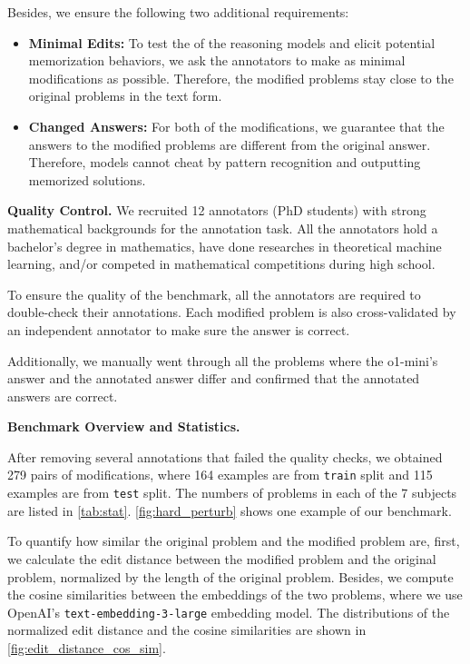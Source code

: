 Besides, we ensure the following two additional requirements:

\begin{itemize}[itemsep=1pt, parsep=1pt, topsep=1pt]
\item \textbf{Minimal Edits:} To test the  of the reasoning models and elicit potential memorization behaviors, we ask the annotators to make as minimal modifications as possible. Therefore, the modified problems stay close to the original problems in the text form.  

\item \textbf{Changed Answers:} For both of the modifications, we guarantee that the answers to the modified problems are different from the original answer. Therefore, models cannot cheat by pattern recognition and outputting memorized solutions. %
\end{itemize}




\textbf{Quality Control.}
We recruited 12 annotators (PhD students) with strong mathematical backgrounds for the annotation task. All the annotators hold a bachelor's degree in mathematics, have done researches in theoretical machine learning, and/or competed in mathematical competitions during high school.

To ensure the quality of the benchmark, all the annotators are required to double-check their annotations. Each modified problem is also cross-validated by an independent annotator to make sure the answer is correct.

Additionally, we manually went through all the problems where the o1-mini's answer and the annotated answer differ and confirmed that the annotated answers are correct. %



\textbf{Benchmark Overview and Statistics.}

After removing several annotations that failed the quality checks, we obtained 279 pairs of modifications, where 164 examples are from \texttt{train} split and 115 examples are from \texttt{test} split. The numbers of problems in each 
 of the 7 subjects are listed in \cref{tab:stat}. \cref{fig:hard_perturb} shows one example of our benchmark.

To quantify how similar the original problem and the modified problem are,  first, we calculate the edit distance between the modified problem and the original problem, normalized by the length of the original problem. Besides, we compute the cosine similarities between the embeddings of the two problems, where we use OpenAI's \texttt{text-embedding-3-large} embedding model. The distributions of the normalized edit distance and the cosine similarities are shown in \cref{fig:edit_distance_cos_sim}. 


